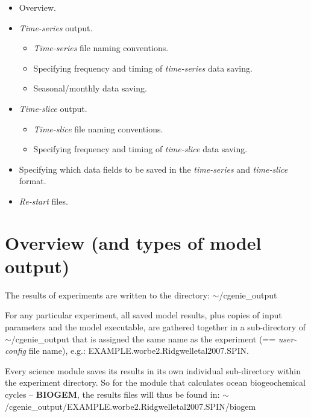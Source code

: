 \documentclass[11pt,fleqn]{book} %
\begin{document}
\begin{itemize}
        \item Overview.
        \item \textit{Time-series} output.
        \begin{itemize}
                \item \textit{Time-series} file naming conventions.
                \item Specifying frequency and timing of \textit{time-series} data saving.
                \item Seasonal/monthly data saving.
        \end{itemize}
        \item \textit{Time-slice} output.
        \begin{itemize}
                \item \textit{Time-slice} file naming conventions.
                \item Specifying frequency and timing of \textit{time-slice} data saving.
        \end{itemize}
        \item Specifying which data fields to be saved in the \textit{time-series} and \textit{time-slice} format.
        \item \textit{Re-start} files.
\end{itemize}


\newpage


\section{Overview (and types of model output)}

The results of experiments are written to the directory: \textsf{\footnotesize \(\sim\)/cgenie\_output}

For any particular experiment, all saved model results, plus copies of input parameters and the model executable, are gathered together in a sub-directory of \textsf{\footnotesize \(\sim\)/cgenie\_output} that is assigned the same name as the experiment (== \textit{user-config} file name), e.g.: \textsf{\footnotesize EXAMPLE.worbe2.Ridgwelletal2007.SPIN}.

Every science module saves its results in its own individual sub-directory within the experiment directory. So for the module that calculates ocean biogeochemical cycles -- \textbf{BIOGEM}, the results files will thus be found in: \textsf{\footnotesize \(\sim\)/cgenie\_output/EXAMPLE.worbe2.Ridgwelletal2007.SPIN/biogem}
\end{document}
